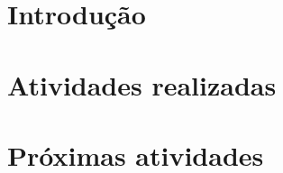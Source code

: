 \documentclass[
	12pt,				%
	oneside,			%
	a4paper,			%
	sumario=tradicional,
	english,			%
	french,				%
	spanish,			%
	brazil,				%
]{abntex2}
\begin{document}

\frenchspacing 


 \imprimirfolhaderosto

\tableofcontents*
\cleardoublepage

\textual
\pagestyle{simple}

\begingroup
\let\clearpage\relax


\chapter{Introdução}\label{ch::intro}


%

\chapter{Atividades realizadas}\label{ch::realizadas}


\chapter{Próximas atividades}\label{ch::proximas}


% 


\endgroup

\postextual




\printindex
\end{document}

